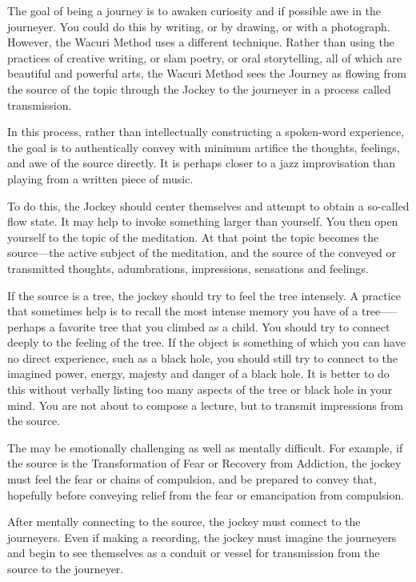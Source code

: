 \documentclass[12pt]{book}
\begin{document}
The goal of being a journey is to awaken curiosity and if possible awe in the journeyer. You could do this by writing, or by drawing, or with a photograph. However, the Wacuri Method uses a different technique. Rather than using the practices of creative writing, or slam poetry, or oral storytelling, all of which are beautiful and powerful arts, the Wacuri Method sees the Journey as flowing from the source of the topic through the Jockey to the journeyer in a process called transmission.
					
In this process, rather than intellectually constructing a spoken-word experience, the goal is to authentically convey with minimum artifice the thoughts, feelings, and awe of the source directly. It is perhaps closer to a jazz improvisation than playing from a written piece of music.
					
To do this, the Jockey should center themselves and attempt to obtain a so-called flow state. It may help to invoke something larger than yourself. You then open yourself to the topic of the meditation. At that point the topic becomes the source—the active subject of the meditation, and the source of the conveyed or transmitted thoughts, adumbrations, impressions, sensations and feelings.
					
If the source is a tree, the jockey should try to feel the tree intensely. A practice that sometimes help is to recall the most intense memory you have of a tree—--perhaps a favorite tree that you climbed as a child. You should try to connect deeply  to the feeling of the tree. If the object is something of which you can have no direct experience, such as a black hole, you should still try to connect to the imagined power, energy, majesty and danger of a black hole. It is better to do this without verbally listing too many aspects of the tree or black hole in your mind. You are not about to compose a lecture, but to transmit impressions from the source.
					
The may be emotionally challenging as well as mentally difficult. For example, if the source is the Transformation of Fear or Recovery from Addiction, the jockey must feel the fear or chains of compulsion, and be prepared to convey that, hopefully before conveying relief from the fear or emancipation from compulsion.
					
After mentally connecting to the source, the jockey must connect to the journeyers. Even if making a recording, the jockey must imagine the journeyers and begin to see themselves as a conduit or vessel for transmission from the source to the journeyer.
					
\end{document}
